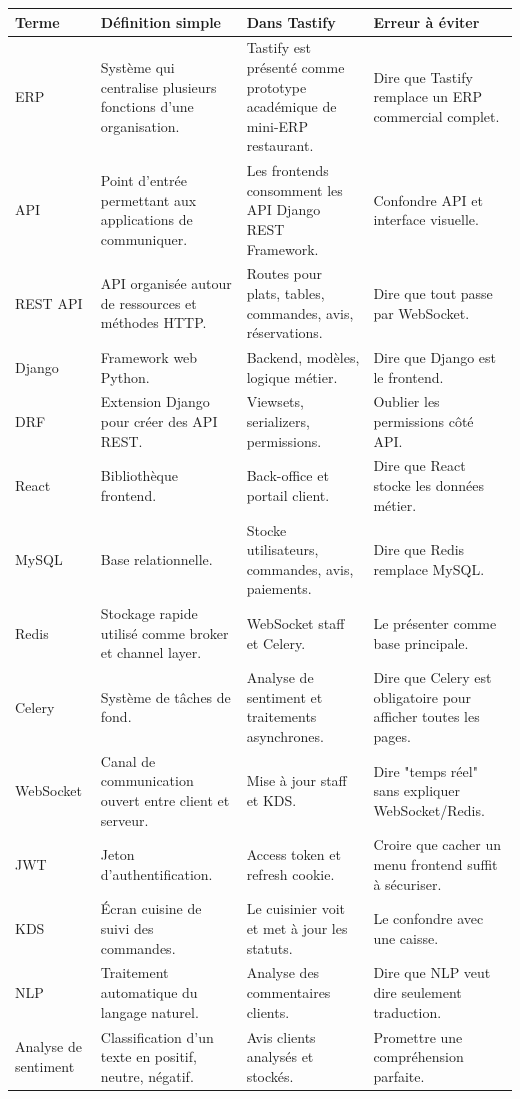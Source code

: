 \documentclass[11pt,a4paper]{article}
\begin{document}
\begin{longtable}{p{2.8cm}p{4cm}p{4cm}p{4cm}}
\toprule
\textbf{Terme} & \textbf{Définition simple} & \textbf{Dans Tastify} & \textbf{Erreur à éviter}\\
\midrule
ERP & Système qui centralise plusieurs fonctions d'une organisation. & Tastify est présenté comme prototype académique de mini-ERP restaurant. & Dire que Tastify remplace un ERP commercial complet.\\
API & Point d'entrée permettant aux applications de communiquer. & Les frontends consomment les API Django REST Framework. & Confondre API et interface visuelle.\\
REST API & API organisée autour de ressources et méthodes HTTP. & Routes pour plats, tables, commandes, avis, réservations. & Dire que tout passe par WebSocket.\\
Django & Framework web Python. & Backend, modèles, logique métier. & Dire que Django est le frontend.\\
DRF & Extension Django pour créer des API REST. & Viewsets, serializers, permissions. & Oublier les permissions côté API.\\
React & Bibliothèque frontend. & Back-office et portail client. & Dire que React stocke les données métier.\\
MySQL & Base relationnelle. & Stocke utilisateurs, commandes, avis, paiements. & Dire que Redis remplace MySQL.\\
Redis & Stockage rapide utilisé comme broker et channel layer. & WebSocket staff et Celery. & Le présenter comme base principale.\\
Celery & Système de tâches de fond. & Analyse de sentiment et traitements asynchrones. & Dire que Celery est obligatoire pour afficher toutes les pages.\\
WebSocket & Canal de communication ouvert entre client et serveur. & Mise à jour staff et KDS. & Dire "temps réel" sans expliquer WebSocket/Redis.\\
JWT & Jeton d'authentification. & Access token et refresh cookie. & Croire que cacher un menu frontend suffit à sécuriser.\\
KDS & Écran cuisine de suivi des commandes. & Le cuisinier voit et met à jour les statuts. & Le confondre avec une caisse.\\
NLP & Traitement automatique du langage naturel. & Analyse des commentaires clients. & Dire que NLP veut dire seulement traduction.\\
Analyse de sentiment & Classification d'un texte en positif, neutre, négatif. & Avis clients analysés et stockés. & Promettre une compréhension parfaite.\\

\end{longtable}
\end{document}
